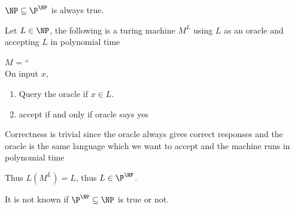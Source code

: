 $\NP \subseteq \P^{\NP}$ is always true.

Let $L \in \NP$, the following is a turing machine $M^{L}$ using $L$ as an oracle and accepting $L$ in polynomial time

$M$ = ``\\
On input $x$,
\begin{enumerate}
    \item Query the oracle if $x \in L$.
    \item accept if and only if oracle says yes
\end{enumerate}

Correctness is trivial since the oracle always gives correct responses and the oracle is the same language which we want to accept and the machine runs in polynomial time

Thus $L(M^L) = L$, thus $L \in \P^{\NP}$.


It is not known if $\P^\NP \subseteq \NP$ is true or not.










